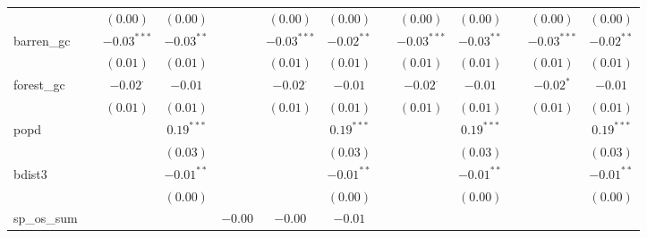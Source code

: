 \begin{sidewaystable}
\begin{center}
{\begin{tabular}{l c c c c c c c c c c c c}
                    &               & $(0.00)$        & $(0.00)$        &               & $(0.00)$        & $(0.00)$        &               & $(0.00)$        & $(0.00)$       &                 & $(0.00)$        & $(0.00)$        \\
barren\_gc          &               & $-0.03^{***}$   & $-0.03^{**}$    &               & $-0.03^{***}$   & $-0.02^{**}$    &               & $-0.03^{***}$   & $-0.03^{**}$   &                 & $-0.03^{***}$   & $-0.02^{**}$    \\
                    &               & $(0.01)$        & $(0.01)$        &               & $(0.01)$        & $(0.01)$        &               & $(0.01)$        & $(0.01)$       &                 & $(0.01)$        & $(0.01)$        \\
forest\_gc          &               & $-0.02^{\cdot}$ & $-0.01$         &               & $-0.02^{\cdot}$ & $-0.01$         &               & $-0.02^{\cdot}$ & $-0.01$        &                 & $-0.02^{*}$     & $-0.01$         \\
                    &               & $(0.01)$        & $(0.01)$        &               & $(0.01)$        & $(0.01)$        &               & $(0.01)$        & $(0.01)$       &                 & $(0.01)$        & $(0.01)$        \\
popd                &               &                 & $0.19^{***}$    &               &                 & $0.19^{***}$    &               &                 & $0.19^{***}$   &                 &                 & $0.19^{***}$    \\
                    &               &                 & $(0.03)$        &               &                 & $(0.03)$        &               &                 & $(0.03)$       &                 &                 & $(0.03)$        \\
bdist3              &               &                 & $-0.01^{**}$    &               &                 & $-0.01^{**}$    &               &                 & $-0.01^{**}$   &                 &                 & $-0.01^{**}$    \\
                    &               &                 & $(0.00)$        &               &                 & $(0.00)$        &               &                 & $(0.00)$       &                 &                 & $(0.00)$        \\
sp\_os\_sum         &               &                 &                 & $-0.00$       & $-0.00$         & $-0.01$         &               &                 &                &                 &                 &                 \\

\end{tabular}}
\end{center}
\end{sidewaystable}
